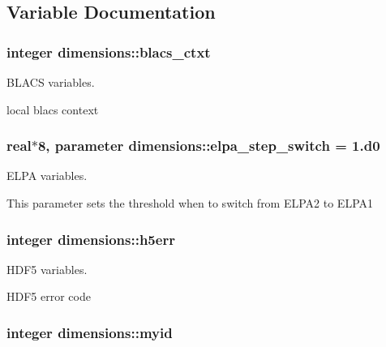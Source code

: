 \subsection{Variable Documentation}
\hypertarget{namespacedimensions_a3db5b35c702a41e8491992c968e690ae}{}
\subsubsection[{blacs\+\_\+ctxt}]{\setlength{\rightskip}{0pt plus 5cm}integer dimensions\+::blacs\+\_\+ctxt}\label{namespacedimensions_a3db5b35c702a41e8491992c968e690ae}


B\+L\+A\+C\+S variables. 

local blacs context \hypertarget{namespacedimensions_a9ba7a66f9ea734e4a601d9a958e97410}{}
\subsubsection[{elpa\+\_\+step\+\_\+switch}]{\setlength{\rightskip}{0pt plus 5cm}real$\ast$8, parameter dimensions\+::elpa\+\_\+step\+\_\+switch = 1.d0}\label{namespacedimensions_a9ba7a66f9ea734e4a601d9a958e97410}


E\+L\+P\+A variables. 

This parameter sets the threshold when to switch from E\+L\+P\+A2 to E\+L\+P\+A1 \hypertarget{namespacedimensions_a243ee55b5b7e8f7c8bfd83e901331bc3}{}
\subsubsection[{h5err}]{\setlength{\rightskip}{0pt plus 5cm}integer dimensions\+::h5err}\label{namespacedimensions_a243ee55b5b7e8f7c8bfd83e901331bc3}


H\+D\+F5 variables. 

H\+D\+F5 error code \hypertarget{namespacedimensions_a5f4a3aff006de1bb6f79bca467cad6f4}{}
\subsubsection[{myid}]{\setlength{\rightskip}{0pt plus 5cm}integer dimensions\+::myid}\label{namespacedimensions_a5f4a3aff006de1bb6f79bca467cad6f4}



